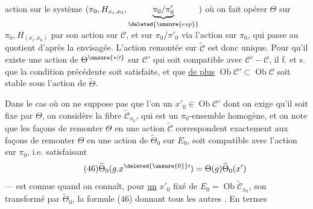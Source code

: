 action sur  le système $(\pi_0,H_{x_i,x_0},\underbrace{\pi_0/\pi'_0}_{\deleted{\unsure{esp}}})$ où on fait opérer $\Theta$ sur $\pi_0,H_{(x_i,x_0)}$ par son action sur $\mathcal C$, et sur $\pi_0/\pi'_0$ via l'action sur $\pi_0$, qui passe au quotient d'après la    envisagée. L'action  remontée   sur $\widetilde{\mathcal C}$ est donc unique. Pour qu'il existe une action de $\Theta^{\unsure{*|\prime}}$ sur $\mathcal C'$ qui soit compatible avec $\mathcal C'-\mathcal C$, il f. et s. que la condition précédente soit satisfaite, et que \uline{de plus} $\operatorname{Ob}\mathcal C'\subset\operatorname{Ob}\mathcal C$ soit stable sous  l'action de $\widetilde\Theta$.

Dans le cas où on ne suppose pas que l'on   un $x'_0\in\operatorname{Ob}\mathcal C'$ dont on exige qu'il soit fixe par $\Theta$, on considère la fibre  $\widetilde{\mathcal C}_{x_0}$, qui est un $\pi_0$-ensemble  homogène, et on note que les façons de remonter $\Theta$ en une action \inserted{$\widetilde\Theta$}  $\widetilde{\mathcal C}$ correspondent  exactement aux façons de remonter $\Theta$ en une action de $\widetilde\Theta_0$ sur $E_0$,  soit compatible avec l'action sur $\pi_0$, i.e. satisfaisant
\[
\tag{46}\widetilde\Theta_0(g.x^{\deleted{\unsure{0}}\prime})=\Theta(g)\widetilde\Theta_0(x')
\]
---   est connue quand on connaît, pour \uline{un} $x'_0$ fixé de $E_0=\operatorname{Ob}\widetilde{\mathcal C}_{x_0}$, son transformé par $\widetilde\Theta_0$, la formule (46) donnant tous les autres . En termes
